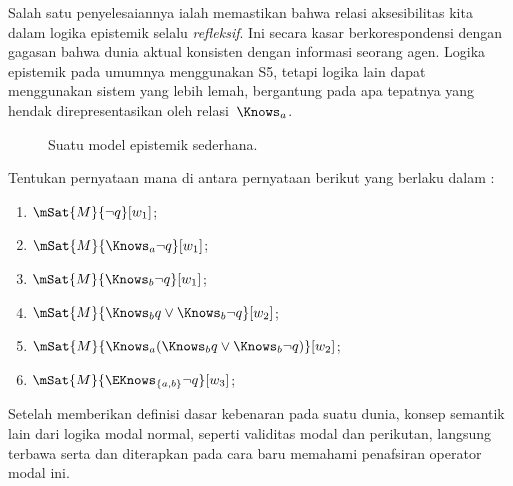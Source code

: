 \documentclass[../../../include/open-logic-section]{subfiles}
\begin{document}
Salah satu penyelesaiannya ialah memastikan bahwa relasi aksesibilitas kita
dalam logika epistemik selalu \emph{refleksif}. Ini secara kasar
berkorespondensi dengan gagasan bahwa dunia aktual konsisten dengan informasi
seorang agen. Logika epistemik pada umumnya menggunakan S5, tetapi logika lain
dapat menggunakan sistem yang lebih lemah, bergantung pada apa tepatnya yang
hendak direpresentasikan oleh relasi~$\Knows_a$.

\begin{figure}
  \begin{center}
  \end{center}
  \caption{Suatu model epistemik sederhana.}
\end{figure}

\begin{prob}
  Tentukan pernyataan mana di antara pernyataan berikut yang berlaku dalam
  :
  \begin{enumerate}
    \item $\mSat{M}{\lnot q}[w_1]$;
    \item $\mSat{M}{\Knows_a \lnot q}[w_1]$;
    \item $\mSat{M}{\Knows_b \lnot q}[w_1]$;
    \item $\mSat{M}{\Knows_b q \lor \Knows_b \lnot q}[w_2]$;
    \item $\mSat{M}{\Knows_a( \Knows_b q \lor \Knows_b \lnot q)}[w_2]$;
    \item $\mSat{M}{\EKnows_{\{a,b\}} \lnot q}[w_3]$;
    \end{enumerate}
\end{prob}

Setelah memberikan definisi dasar kebenaran pada suatu dunia, konsep semantik
lain dari logika modal normal, seperti validitas modal dan perikutan, langsung
terbawa serta dan diterapkan pada cara baru memahami penafsiran operator
modal ini.
\end{document}
